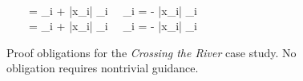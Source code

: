 \begin{figure}[p]
\begin{center}
\begin{sllisting}
\pbinference\\
  \hspace{0.5em}\text{--}\hspace{0.4em}\Init \, \land \, \Inv \, \land \, \rcybmax = \omega_i + |x_i| \eta_i \, \land \, \omega_i = \rcyb - |x_i| \eta_i \limply \rcyb \le \rcybmax\\
  \hspace{0.5em}\text{--}\hspace{0.4em}\Init \, \land \, \Inv \, \land \, \rcybmin = \omega_i + |x_i| \eta_i \, \land \, \omega_i = \rcyb - |x_i| \eta_i \limply \rcyb \ge \rcybmin\\
\end{sllisting}
\end{center}
\caption{Proof obligations for the \emph{Crossing the River} case study. No obligation requires nontrivial guidance.}
\label{fig:targets-crossing-the-river}
\Description[]{}
\end{figure}
